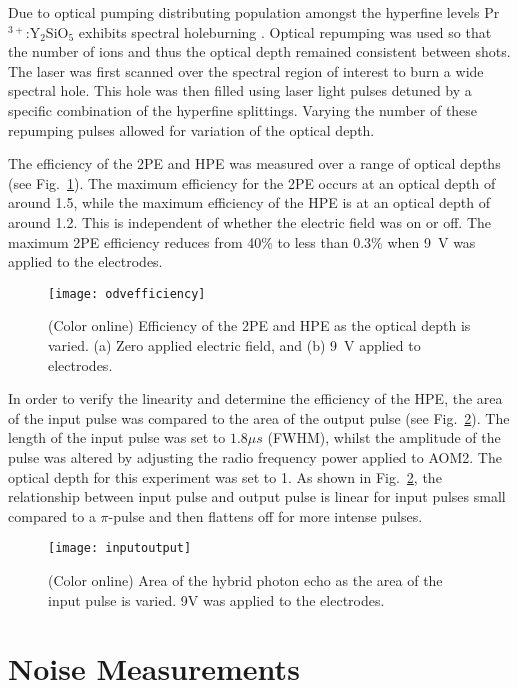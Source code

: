 \documentclass[superscriptaddress,pra,twocolumn,showpacs,amsmath,amssymb,aps,a4paper]{revtex4}
\newcommand{\PRYSO}{Pr$^{3+}$:Y$_2$SiO$_5$ }
\begin{document}
Due to optical pumping distributing population amongst the hyperfine
levels \PRYSO exhibits spectral holeburning \cite{holi93}. Optical
repumping was used so that the number of ions and thus the optical
depth remained consistent between shots. The laser was first scanned over the spectral region of
interest to burn a wide spectral hole. This hole was then filled 
using laser light pulses detuned by a specific combination of the hyperfine
splittings. Varying the number of these repumping pulses allowed for
variation of the optical depth.

The efficiency of the 2PE and HPE was measured over a range of optical
depths (see Fig.~\ref{fig:odvefficiency}).
The maximum efficiency for the 2PE occurs at an optical depth of around
1.5, while the maximum efficiency of the HPE is at an optical depth
of around 1.2. This is independent of whether the electric field was on or
off. The maximum 2PE efficiency reduces from 40\% to less than 0.3\%
when 9~V was applied to the electrodes.


\begin{figure}%
  \centering
  \texttt{[image: odvefficiency]}
\caption{\label{fig:odvefficiency} (Color online) Efficiency of the 2PE and HPE as the optical depth is varied. (a) Zero applied electric field, and (b) 9~V applied to electrodes. }
\end{figure}

In order to verify the linearity and determine the efficiency of the
HPE, the area of the input pulse was compared to the area of the
output pulse (see Fig.~\ref{fig:inputoutput}).  The length of the
input pulse was set to $1.8\mu s$ (FWHM), whilst the amplitude of the
pulse was altered by adjusting the radio frequency power applied to
AOM2.  The optical depth for this experiment was set to 1. As shown in
Fig.~\ref{fig:inputoutput}, the relationship between input pulse and
output pulse is linear for input pulses small compared to a $\pi$-pulse 
and then flattens off for more intense pulses.

\begin{figure}[t]
  \centering
  \texttt{[image: inputoutput]}
\caption{\label{fig:inputoutput} (Color online) Area of the hybrid photon echo as the area of the input pulse is varied. 9V was applied to the electrodes.}
\end{figure}



\section{Noise Measurements}
\end{document}
